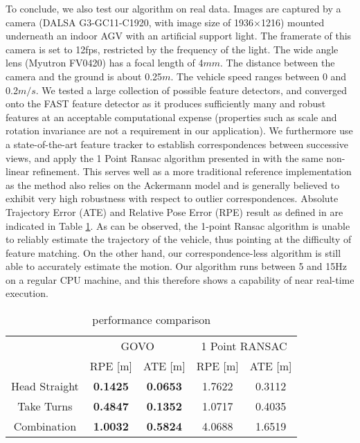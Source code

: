 \documentclass[letterpaper, 10 pt, conference]{ieeeconf}  %
\begin{document}
To conclude, we also test our algorithm on real data. Images are captured by a camera (DALSA G3-GC11-C1920, with image size of 1936$\times$1216) mounted underneath an indoor AGV with an artificial support light. The framerate of this camera is set to 12fps, restricted by the frequency of the light. The wide angle lens (Myutron FV0420) has a focal length of 4$mm$. The distance between the camera and the ground is about 0.25$m$. The vehicle speed ranges between 0 and 0.2$m/s$. We tested a large collection of possible feature detectors, and converged onto the FAST feature detector \cite{rosten2008faster} as it produces sufficiently many and robust features at an acceptable computational expense (properties such as scale and rotation invariance are not a requirement in our application). We furthermore use a state-of-the-art feature tracker to establish correspondences between successive views, and apply the 1 Point Ransac algorithm presented in \cite{scaramuzza2009real} with the same non-linear refinement. This serves well as a more traditional reference implementation as the method also relies on the Ackermann model and is generally believed to exhibit very high robustness with respect to outlier correspondences. Absolute Trajectory Error (ATE) and Relative Pose Error (RPE) result as defined in \cite{sturm2012benchmark} are indicated in Table \ref{table_GOVO}. As can be observed, the 1-point Ransac algorithm is unable to reliably estimate the trajectory of the vehicle, thus pointing at the difficulty of feature matching. On the other hand, our correspondence-less algorithm is still able to accurately estimate the motion. Our algorithm runs between 5 and 15Hz on a regular CPU machine, and this therefore shows a capability of near real-time execution.

\begin{table}
\vspace{0.2cm}
\renewcommand{\arraystretch}{1.2}
\caption{performance comparison}
\label{table_GOVO}
\centering
\begin{tabular}{|c|c|c|c|c|}
\hline
& \multicolumn{2}{|c|}{GOVO} & \multicolumn{2}{|c|}{1 Point RANSAC} \\
\cline{2-5}
& RPE [m] & ATE [m] & RPE [m] & ATE [m] \\
\hline
Head Straight & \textbf{0.1425} & \textbf{0.0653} & 1.7622 & 0.3112 \\
\hline
Take Turns & \textbf{0.4847} & \textbf{0.1352} & 1.0717 & 0.4035 \\
\hline
Combination & \textbf{1.0032} & \textbf{0.5824} & 4.0688 & 1.6519 \\
\hline
\end{tabular}
\end{table}
\end{document}
